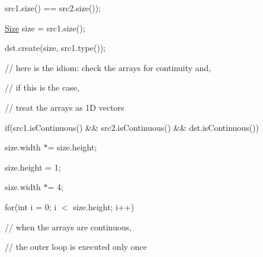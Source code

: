 {\ttfamily }

{\ttfamily }

{\ttfamily src1.\+size() == src2.\+size());}

{\ttfamily }

{\ttfamily }

{\ttfamily \mbox{\hyperlink{classorg_1_1opencv_1_1core_1_1_size}{Size}} size = src1.\+size();}

{\ttfamily }

{\ttfamily }

{\ttfamily dst.\+create(size, src1.\+type());}

{\ttfamily }

{\ttfamily }

{\ttfamily // here is the idiom\+: check the arrays for continuity and,}

{\ttfamily }

{\ttfamily }

{\ttfamily // if this is the case,}

{\ttfamily }

{\ttfamily }

{\ttfamily // treat the arrays as 1D vectors}

{\ttfamily }

{\ttfamily }

{\ttfamily if(src1.\+is\+Continuous() \&\& src2.\+is\+Continuous() \&\& dst.\+is\+Continuous())}

{\ttfamily }

{\ttfamily }

{\ttfamily size.\+width $\ast$= size.\+height;}

{\ttfamily }

{\ttfamily }

{\ttfamily size.\+height = 1;}

{\ttfamily }

{\ttfamily }

{\ttfamily size.\+width $\ast$= 4;}

{\ttfamily }

{\ttfamily }

{\ttfamily for(int i = 0; i $<$ size.\+height; i++)}

{\ttfamily }

{\ttfamily }

{\ttfamily // when the arrays are continuous,}

{\ttfamily }

{\ttfamily }

{\ttfamily // the outer loop is executed only once}


